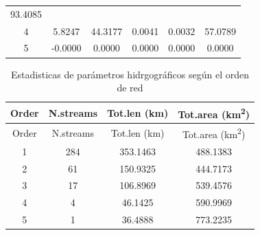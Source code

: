 \documentclass[11pt,]{article}
\begin{document}
\begin{longtable}[]{@{}cccccc@{}}
\begin{minipage}[t]{0.13\columnwidth}
93.4085\strut
\end{minipage}\tabularnewline
\begin{minipage}[t]{0.08\columnwidth}\centering\strut
4\strut
\end{minipage} & \begin{minipage}[t]{0.11\columnwidth}\centering\strut
5.8247\strut
\end{minipage} & \begin{minipage}[t]{0.26\columnwidth}\centering\strut
44.3177\strut
\end{minipage} & \begin{minipage}[t]{0.11\columnwidth}\centering\strut
0.0041\strut
\end{minipage} & \begin{minipage}[t]{0.14\columnwidth}\centering\strut
0.0032\strut
\end{minipage} & \begin{minipage}[t]{0.13\columnwidth}\centering\strut
57.0789\strut
\end{minipage}\tabularnewline
\begin{minipage}[t]{0.08\columnwidth}\centering\strut
5\strut
\end{minipage} & \begin{minipage}[t]{0.11\columnwidth}\centering\strut
-0.0000\strut
\end{minipage} & \begin{minipage}[t]{0.26\columnwidth}\centering\strut
0.0000\strut
\end{minipage} & \begin{minipage}[t]{0.11\columnwidth}\centering\strut
0.0000\strut
\end{minipage} & \begin{minipage}[t]{0.14\columnwidth}\centering\strut
0.0000\strut
\end{minipage} & \begin{minipage}[t]{0.13\columnwidth}\centering\strut
0.0000\strut
\end{minipage}\tabularnewline
\bottomrule
\end{longtable}

\begin{longtable}[]{@{}cccc@{}}
\caption{\label{parh} Estadisticas de parámetros hidrgográficos según el
orden de red}\tabularnewline
\toprule
Order & N.streams & Tot.len (km) & Tot.area
(km\textsuperscript{2})\tabularnewline
\midrule
\endfirsthead
\toprule
Order & N.streams & Tot.len (km) & Tot.area
(km\textsuperscript{2})\tabularnewline
\midrule
\endhead
1 & 284 & 353.1463 & 488.1383\tabularnewline
2 & 61 & 150.9325 & 444.7173\tabularnewline
3 & 17 & 106.8969 & 539.4576\tabularnewline
4 & 4 & 46.1425 & 590.9969\tabularnewline
5 & 1 & 36.4888 & 773.2235\tabularnewline
\bottomrule
\end{longtable}
\end{document}
